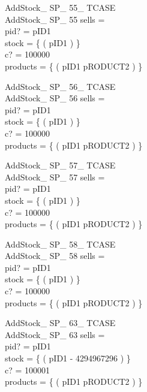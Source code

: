 \begin{schema}{AddStock\_ SP\_ 55\_ TCASE}\\
AddStock\_ SP\_ 55
\where
sells =~\emptyset \\
pid? = pID1 \\
stock = \{ ( pID1  ) \} \\
c? = 100000 \\
products = \{ ( pID1 \mapsto pRODUCT2 ) \}
\end{schema}


\begin{schema}{AddStock\_ SP\_ 56\_ TCASE}\\
AddStock\_ SP\_ 56
\where
sells =~\emptyset \\
pid? = pID1 \\
stock = \{ ( pID1  ) \} \\
c? = 100000 \\
products = \{ ( pID1 \mapsto pRODUCT2 ) \}
\end{schema}


\begin{schema}{AddStock\_ SP\_ 57\_ TCASE}\\
AddStock\_ SP\_ 57
\where
sells =~\emptyset \\
pid? = pID1 \\
stock = \{ ( pID1  ) \} \\
c? = 100000 \\
products = \{ ( pID1 \mapsto pRODUCT2 ) \}
\end{schema}


\begin{schema}{AddStock\_ SP\_ 58\_ TCASE}\\
AddStock\_ SP\_ 58
\where
sells =~\emptyset \\
pid? = pID1 \\
stock = \{ ( pID1  ) \} \\
c? = 100000 \\
products = \{ ( pID1 \mapsto pRODUCT2 ) \}
\end{schema}


\begin{schema}{AddStock\_ SP\_ 63\_ TCASE}\\
AddStock\_ SP\_ 63
\where
sells =~\emptyset \\
pid? = pID1 \\
stock = \{ ( pID1 \mapsto - 4294967296 ) \} \\
c? = 100001 \\
products = \{ ( pID1 \mapsto pRODUCT2 ) \}
\end{schema}


